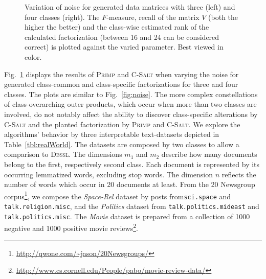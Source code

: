 \begin{figure}[!t]
\centering

\caption{Variation of noise for generated data matrices with three (left) and four classes (right). The $F$-measure, recall of the matrix $V$ (both the higher the better) and the class-wise estimated rank of the calculated factorization (between 16 and 24 can be considered correct) is plotted against the varied parameter. Best viewed in color.}
\label{fig:synthClass}
\end{figure}
Fig.~\ref{fig:synthClass} displays the results of \textsc{Primp} and \textsc{C-Salt} when varying the noise for generated class-common and class-specific factorizations for three and four classes. The plots are similar to Fig.~\ref{fig:noise}. The more complex constellations of class-overarching outer products, which occur when more than two classes are involved, do not notably affect the ability to discover class-specific alterations by \textsc{C-Salt} and the planted factorization by \textsc{Primp} and \textsc{C-Salt}.
We explore the algorithms' behavior by three interpretable text-datasets depicted in Table~\ref{tbl:realWorld}. The datasets are composed by two classes to allow a comparison to \textsc{Dbssl}. The dimensions $m_1$ and $m_2$ describe how many documents belong to the first, respectively second class. Each document is represented by its occurring lemmatized words, excluding stop words. The dimension $n$ reflects the number of words which occur in 20 documents at least.
From the 20 Newsgroup corpus\footnote{\url{http://qwone.com/~jason/20Newsgroups/}}, we compose the \emph{Space-Rel} dataset by posts from\texttt{sci.space} and \texttt{talk.religion.misc}, and the \emph{Politics} dataset from \texttt{talk.politics.mideast} and \texttt{talk.politics.misc}. The \emph{Movie} dataset is prepared from a collection of 1000 negative and 1000 positive movie reviews\footnote{\url{http://www.cs.cornell.edu/People/pabo/movie-review-data/}}.

